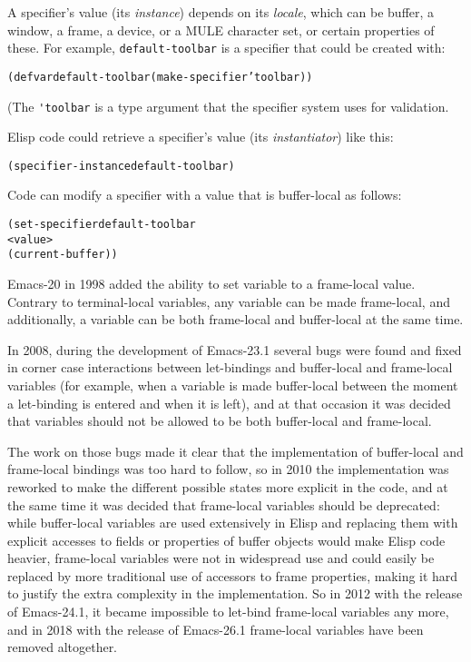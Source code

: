 \documentclass[format=acmsmall, review=false, screen=true]{acmart}
\newcommand \Elisp {Elisp}
\begin{document}
A specifier's value (its \textit{instance}) depends on its
\textit{locale}, which can be buffer, a window, a frame, a device, or a MULE
character set, or certain properties of these.  For example,
\texttt{default-toolbar} is a specifier that could be created with:
%
\begin{alltt}
(defvar default-toolbar (make-specifier 'toolbar))
\end{alltt}
%
(The \verb|'toolbar| is a type argument that the specifier system uses
for validation.

\Elisp{} code could retrieve a specifier's value (its
\textit{instantiator}) like this:
%
\begin{alltt}
(specifier-instance default-toolbar)
\end{alltt}
%
Code can modify a specifier with a value that is buffer-local as
follows:
%
\begin{alltt}
(set-specifier default-toolbar
               <value>
               (current-buffer))
\end{alltt}
%
Emacs-20 in 1998 added the ability to set variable to a frame-local
value.  Contrary to terminal-local variables, any variable can be made
frame-local, and additionally, a variable can be both frame-local and
buffer-local at the same time.


In 2008, during the development of Emacs-23.1 several bugs were found and
fixed in corner case interactions between let-bindings and buffer-local and
frame-local variables (for example, when a variable is made buffer-local
between the moment a let-binding is entered and when it is left), and at
that occasion it was decided that variables should not be allowed to be both
buffer-local and frame-local.

The work on those bugs made it clear that the implementation of buffer-local
and frame-local bindings was too hard to follow, so in 2010 the
implementation was reworked to make the different possible states more
explicit in the code, and at the same time it was decided that frame-local
variables should be deprecated: while buffer-local variables are used
extensively in \Elisp{} and replacing them with explicit accesses to fields
or properties of buffer objects would make \Elisp{} code heavier,
frame-local variables were not in widespread use and could easily be
replaced by more traditional use of accessors to frame properties, making it
hard to justify the extra complexity in the implementation.  So in 2012 with
the release of Emacs-24.1, it became impossible to let-bind frame-local
variables any more, and in 2018 with the release of Emacs-26.1 frame-local
variables have been removed altogether.
\end{document}
